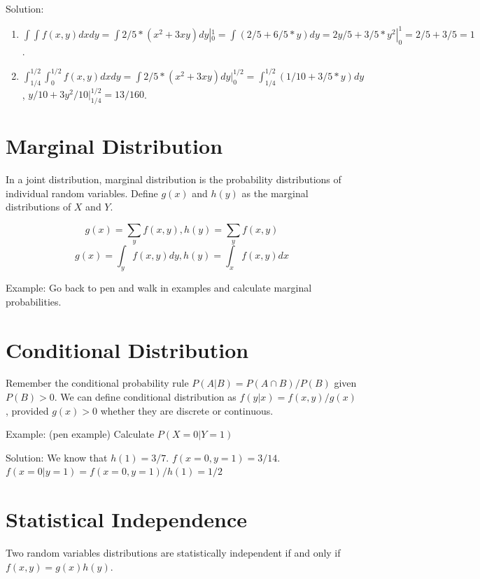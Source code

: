 \documentclass[]{book}
\theoremstyle{definition}
\theoremstyle{definition}
\theoremstyle{definition}
\theoremstyle{remark}
\begin{document}
Solution:

\begin{enumerate}
\def\labelenumi{\alph{enumi}.}
\item
  \(\int\int f(x,y)dxdy = \int 2/5*(x^2 + 3xy)dy|_0^1 = \int (2/5 + 6/5*y)dy = 2y/5 + 3/5*y^2 |^1_0 = 2/5 + 3/5 = 1\).
\item
  \(\int_{1/4}^{1/2}\int_0^{1/2} f(x,y)dxdy = \int 2/5*(x^2 + 3xy)dy|_0^{1/2} = \int_{1/4}^{1/2} (1/10 + 3/5*y) dy\),
  \(y/10 + 3y^2/10|_{1/4}^{1/2} = 13/160\).
\end{enumerate}

\hypertarget{marginal-distribution}{%
\section{Marginal Distribution}\label{marginal-distribution}}

In a joint distribution, marginal distribution is the probability
distributions of individual random variables. Define \(g(x)\) and
\(h(y)\) as the marginal distributions of \(X\) and \(Y\).

\[g(x) = \sum_y f(x,y), h(y) = \sum_y f(x,y)\]
\[g(x) = \int_y f(x,y) dy, h(y) = \int_x f(x,y) dx\]

Example: Go back to pen and walk in examples and calculate marginal
probabilities.

\hypertarget{conditional-distribution}{%
\section{Conditional Distribution}\label{conditional-distribution}}

Remember the conditional probability rule \(P(A|B) = P(A \cap B)/P(B)\)
given \(P(B) > 0\). We can define conditional distribution as
\(f(y|x) = f(x,y)/g(x)\), provided \(g(x) > 0\) whether they are
discrete or continuous.

Example: (pen example) Calculate \(P(X=0|Y=1)\)

Solution: We know that \(h(1) = 3/7\). \(f(x=0,y=1) = 3/14\).
\(f(x=0|y=1) = f(x=0,y=1)/h(1) = 1/2\)

\hypertarget{statistical-independence}{%
\section{Statistical Independence}\label{statistical-independence}}

Two random variables distributions are statistically independent if and
only if \(f(x,y) = g(x)h(y)\).
\end{document}
